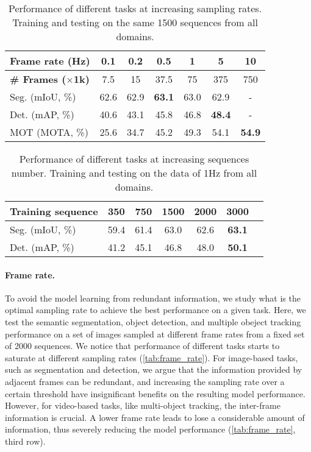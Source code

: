 \begin{table}[t]
    \centering
    \footnotesize
    \setlength{\tabcolsep}{5pt}
    \begin{tabular}{l|cccccc}
    \toprule
       \textbf{Frame rate (Hz)}  & 0.1 & 0.2 & 0.5 & 1 & 5 & 10 \\
       \midrule
       \textbf{\# Frames ($\times$1k)} & 7.5 & 15 & 37.5 & 75 & 375 & 750 \\ \midrule
        Seg. (mIoU, \%) & 62.6 & 62.9 & \textbf{63.1} & 63.0 & 62.9 & - \\
        Det. (mAP, \%) & 40.6 & 43.1 & 45.8  & 46.8 & \textbf{48.4} & - \\
        MOT (MOTA, \%) & 25.6  & 34.7 & 45.2 & 49.3 & 54.1 &  \textbf{54.9} \\
        \bottomrule
    \end{tabular}
    \caption{\footnotesize{Performance of different tasks at increasing sampling rates. Training and testing on the same 1500 sequences from all domains.}}
    \label{tab:frame_rate}
    \vspace{-1em}
\end{table}

\begin{table}[h]
    \centering
    \footnotesize
    \setlength{\tabcolsep}{5pt}
    \begin{tabular}{l|cccccc}
    \toprule
       \textbf{Training sequence }  & 350 & 750 & 1500 & 2000 & 3000  \\
       \midrule
        Seg. (mIoU, \%) & 59.4 & 61.4 & 63.0 & 62.6 & \textbf{63.1}\\
        Det. (mAP, \%) & 41.2 & 45.1 & 46.8  & 48.0 & \textbf{50.1} \\
        \bottomrule
    \end{tabular}
    \caption{\footnotesize{Performance of different tasks at increasing sequences number. Training and testing on the data of 1Hz from all domains.}}
    \label{tab:sequences}
    \vspace{-1em}
\end{table}

\paragraph{Frame rate.} 
To avoid the model learning from redundant information, we study what is the optimal sampling rate to achieve the best performance on a given task.
Here, we test the semantic segmentation, object detection, and multiple obeject tracking performance on a set of images sampled at different frame rates from a fixed set of 2000 sequences. 
We notice that performance of different tasks starts to saturate at different sampling rates  (\autoref{tab:frame_rate}). 
For image-based tasks, such as segmentation and detection, we argue that the information provided by adjacent frames can be redundant, and increasing the sampling rate over a certain threshold have insignificant benefits on the resulting model performance.
However, for video-based tasks, like multi-object tracking, the inter-frame information is crucial. A lower frame rate leads to lose a considerable amount of information, thus severely reducing the model performance (\autoref{tab:frame_rate}, third row). 


